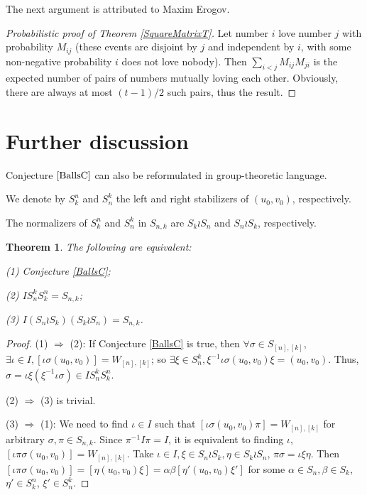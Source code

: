\documentclass[12pt]{article}
\newtheorem{theorem}{Theorem}
\theoremstyle{definition}
\theoremstyle{plain}
\begin{document}
The next argument is attributed to Maxim Erogov.

\begin{proof}[Probabilistic proof of Theorem \ref{SquareMatrixT}]
Let number $i$ love number $j$ with probability $M_{ij}$
(these events are disjoint by $j$ and independent by $i$, with some non-negative probability $i$ does not love nobody). Then 
$\sum_{i<j} M_{ij}M_{ji}$ is the expected number of pairs of numbers
mutually loving each other. Obviously, there are always at most $(t-1)/2$
such pairs, thus the result. 
\end{proof}

\section{Further discussion}

Conjecture $\ref{BallsC}$ can also be reformulated in group-theoretic language.

We denote by $S_k^n$ and $S_n^k$ the left and right stabilizers of $(u_0,v_0)$, respectively.

The normalizers of $S_k^n$ and $S_n^k$ in $S_{n,k}$ are $S_k \wr S_n$ and $S_n \wr S_k$, respectively.

\begin {theorem}
The following are equivalent: 

(1) Conjecture \ref{BallsC}; 

(2) $IS_n^kS_k^n=S_{n,k}$; 

(3) $I (S_n \wr S_k) (S_k \wr S_n) = S_{n,k}$.

\end {theorem}

\begin {proof}

(1) $\Rightarrow$ (2): If Conjecture \ref{BallsC} is true, then $\forall \sigma \in S_{[n],[k]}$, $\exists \iota \in I, [ \iota \sigma (u_0, v_0)] = W_{[n],[k]}$; so $\exists \xi \in S_n^k, \xi^{-1} \iota \sigma (u_0, v_0) \xi = (u_0, v_0)$. Thus, $\sigma = \iota \xi (\xi^{-1} \iota \sigma) \in I S_n^k S_k^n$.

(2) $\Rightarrow$ (3) is trivial.

(3) $\Rightarrow$ (1): We need to find $\iota \in I$ such that $[\iota \sigma (u_0, v_0) \pi] = W_{[n],[k]}$ for arbitrary $\sigma, \pi \in S_{n,k}$. Since $\pi^{-1} I \pi = I$, it is equivalent to finding $\iota$, $[\iota \pi \sigma (u_0, v_0)] = W_{[n],[k]}$. Take $\iota \in I, \xi \in S_n \wr S_k, \eta \in S_k \wr S_n$, $\pi \sigma = \iota \xi \eta$. Then $[\iota \pi \sigma (u_0, v_0)] = [\eta (u_0, v_0) \xi] = \alpha \beta [\eta' (u_0, v_0) \xi']$ for some $\alpha \in S_n, \beta \in S_k$, $\eta' \in S_k^n$, $\xi' \in S_n^k$.

\end {proof}
\end{document}
